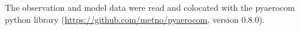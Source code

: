 \documentclass[journal abbreviation, manuscript]{copernicus}
\begin{document}


The observation and model data were read and colocated with the pyaerocom python library (\url{https://github.com/metno/pyaerocom}, version 0.8.0).

















\end{document}
